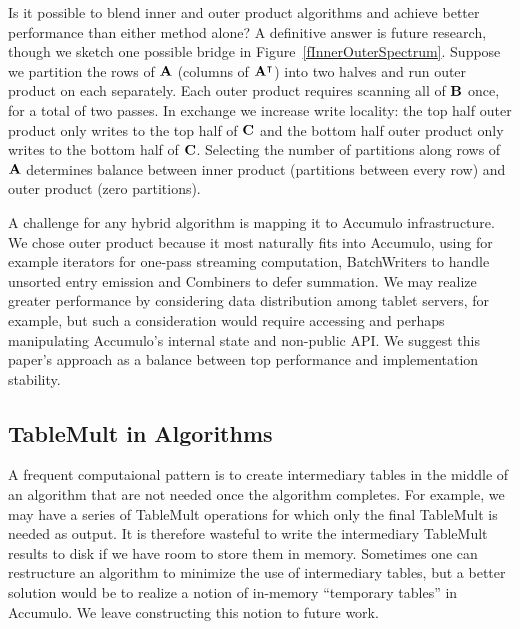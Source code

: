 Is it possible to blend inner and outer product algorithms and achieve better performance than either method alone?
A definitive answer is future research, though we sketch one possible bridge in Figure~\ref{fInnerOuterSpectrum}.
Suppose we partition the rows of $\mathbf{A}$ (columns of $\mathbf{A^{\intercal}}$) into two halves 
and run outer product on each separately.
Each outer product requires scanning all of $\mathbf{B}$ once, for a total of two passes.
In exchange we increase write locality:
the top half outer product only writes to the top half of $\mathbf{C}$ and 
the bottom half outer product only writes to the bottom half of $\mathbf{C}$.
Selecting the number of partitions along rows of $\mathbf{A}$ determines
balance between inner product (partitions between every row) and outer product (zero partitions).

A challenge for any hybrid algorithm is mapping it to Accumulo infrastructure.
We chose outer product because it most naturally fits into Accumulo, 
using for example iterators for one-pass streaming computation, 
BatchWriters to handle unsorted entry emission and Combiners to defer summation.
We may realize greater performance by considering data distribution among tablet servers, for example, 
but such a consideration would require accessing and perhaps manipulating
Accumulo's internal state and non-public API.
We suggest this paper's approach as a balance between top performance and implementation stability.


\subsection{TableMult in Algorithms}
A frequent computaional pattern is to create intermediary tables in the middle of an algorithm 
that are not needed once the algorithm completes.  For example, we may have a series of TableMult operations 
for which only the final TableMult is needed as output.  It is therefore wasteful to write the intermediary
TableMult results to disk if we have room to store them in memory.
Sometimes one can restructure an algorithm to minimize the use of intermediary tables,
but a better solution would be to realize a notion of in-memory ``temporary tables'' in Accumulo.
We leave constructing this notion to future work.

